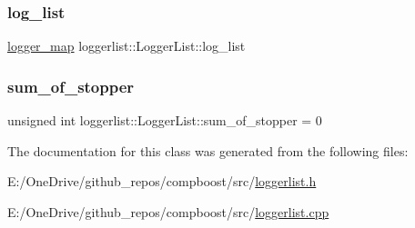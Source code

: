 \subsubsection{\texorpdfstring{log\+\_\+list}{log\_list}}
{\footnotesize\ttfamily \mbox{\hyperlink{loggerlist_8h_afa233b5ec9ffbe76605d913e86d40fe6}{logger\+\_\+map}} loggerlist\+::\+Logger\+List\+::log\+\_\+list\hspace{0.3cm}{\ttfamily [private]}}

\mbox{\label{classloggerlist_1_1_logger_list_a39c3b4cf8f01c0e29606a9b2537da347}} 
\subsubsection{\texorpdfstring{sum\+\_\+of\+\_\+stopper}{sum\_of\_stopper}}
{\footnotesize\ttfamily unsigned int loggerlist\+::\+Logger\+List\+::sum\+\_\+of\+\_\+stopper = 0\hspace{0.3cm}{\ttfamily [private]}}



The documentation for this class was generated from the following files\+:\begin{DoxyCompactItemize}
\item 
E\+:/\+One\+Drive/github\+\_\+repos/compboost/src/\mbox{\hyperlink{loggerlist_8h}{loggerlist.\+h}}\item 
E\+:/\+One\+Drive/github\+\_\+repos/compboost/src/\mbox{\hyperlink{loggerlist_8cpp}{loggerlist.\+cpp}}\end{DoxyCompactItemize}
